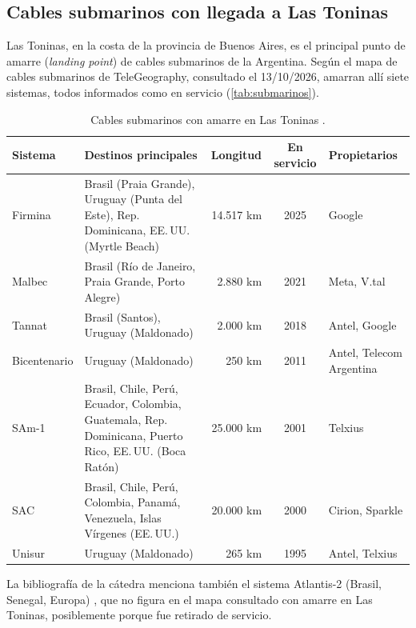 \subsection{Cables submarinos con llegada a Las Toninas}
\label{sec:submarinos}
Las Toninas, en la costa de la provincia de Buenos Aires, es el principal punto de amarre (\textit{landing point}) de cables submarinos de la Argentina. Según el mapa de cables submarinos de TeleGeography, consultado el 13/10/2026, amarran allí siete sistemas, todos informados como en servicio (\autoref{tab:submarinos}).

\begin{table}[H]
    \centering
    \footnotesize
    \caption{Cables submarinos con amarre en Las Toninas \cite{submarine_map}.}
    \label{tab:submarinos}
    \begin{tabular}{|l|p{5.6cm}|r|c|p{2.6cm}|}
        \hline
        \textbf{Sistema} & \textbf{Destinos principales} & \textbf{Longitud} & \textbf{En servicio} & \textbf{Propietarios} \\
        \hline
        Firmina & Brasil (Praia Grande), Uruguay (Punta del Este), Rep. Dominicana, EE.\,UU. (Myrtle Beach) & 14.517 km & 2025 & Google \\
        \hline
        Malbec & Brasil (Río de Janeiro, Praia Grande, Porto Alegre) & 2.880 km & 2021 & Meta, V.tal \\
        \hline
        Tannat & Brasil (Santos), Uruguay (Maldonado) & 2.000 km & 2018 & Antel, Google \\
        \hline
        Bicentenario & Uruguay (Maldonado) & 250 km & 2011 & Antel, Telecom Argentina \\
        \hline
        SAm-1 & Brasil, Chile, Perú, Ecuador, Colombia, Guatemala, Rep. Dominicana, Puerto Rico, EE.\,UU. (Boca Ratón) & 25.000 km & 2001 & Telxius \\
        \hline
        SAC & Brasil, Chile, Perú, Colombia, Panamá, Venezuela, Islas Vírgenes (EE.\,UU.) & 20.000 km & 2000 & Cirion, Sparkle \\
        \hline
        Unisur & Uruguay (Maldonado) & 265 km & 1995 & Antel, Telxius \\
        \hline
    \end{tabular}
\end{table}

La bibliografía de la cátedra menciona también el sistema Atlantis-2 (Brasil, Senegal, Europa) \cite{libro_catedra}, que no figura en el mapa consultado con amarre en Las Toninas, posiblemente porque fue retirado de servicio.

